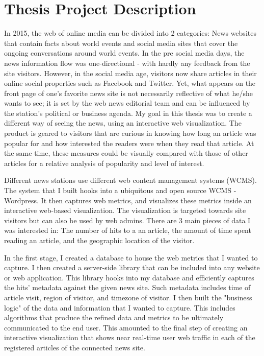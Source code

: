 \documentclass[12pt]{article}
\begin{document}
\tableofcontents

\vfill

\section{Thesis Project Description}
In 2015, the web of online media can be divided into 2 categories: News websites that contain facts about world events and social media sites that cover the ongoing conversations around world events. In the pre social media days, the news information flow was one-directional - with hardly any feedback from the site visitors. However, in the social media age, visitors now share articles in their online social properties such as Facebook and Twitter. Yet, what appears on the front page of one's favorite news site is not necessarily reflective of what he/she wants to see; it is set by the web news editorial team and can be influenced by the station's political or business agenda. My goal in this thesis was to create a different way of seeing the news, using an interactive web visualization. The product is geared to visitors that are curious in knowing how long an article was popular for and how interested the readers were when they read that article. At the same time, these measures could be visually compared with those of other articles for a relative analysis of popularity and level of interest. 

Different news stations use different web content management systems (WCMS). The system that I built hooks into a ubiquitous and open source WCMS - Wordpress. It then captures web metrics, and visualizes these metrics inside an interactive web-based visualization. The visualization is targeted towards site visitors but can also be used by web admins. There are 3 main pieces of data I was interested in: The number of hits to a an article, the amount of time spent reading an article, and the geographic location of the visitor. 

In the first stage, I created a database to house the web metrics that I wanted to capture. I then created a server-side library that can be included into any website or web application. This library hooks into my database and efficiently captures the hits' metadata against the given news site. Such metadata includes time of article visit, region of visitor, and timezone of visitor.  
I then built the "business logic" of the data and information that I wanted to capture. This includes algorithms that produce the refined data and metrics to be ultimately communicated to the end user.
This amounted to the final step of creating an interactive visualization that shows near real-time user web traffic in each of the registered articles of the connected news site.
\end{document}
